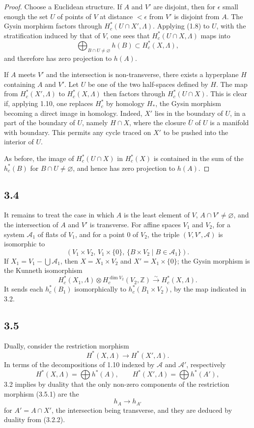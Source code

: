 \documentclass[11pt]{article}
\theoremstyle{definition}
\newcommand{\ZZ}{\mathbb Z}
\begin{document}
\begin{proof}
Choose a Euclidean structure.  If $A$ and $V'$ are disjoint, then for $\epsilon$ small enough the set $U$ of points of $V$ at distance $<\epsilon$ from $V'$ is disjoint from $A$.  The Gysin morphism factors through $H_c^*(U\cap X',\Lambda)$.  Applying (1.8) to $U$, with the stratification induced by that of $V$, one sees that $H_c^*(U\cap X,\Lambda)$ maps into
\[
\bigoplus_{B\cap U\neq\varnothing} h(B)\subset H_c^*(X,\Lambda),
\]
and therefore has zero projection to $h(A)$.

If $A$ meets $V'$ and the intersection is non-transverse, there exists a hyperplane $H$ containing $A$ and $V'$.  Let $U$ be one of the two half-spaces defined by $H$.  The map from $H_c^*(X',\Lambda)$ to $H_c^*(X,\Lambda)$ then factors through $H_c^*(U\cap X)$.  This is clear if, applying 1.10, one replaces $H_c^*$ by homology $H_*$, the Gysin morphism becoming a direct image in homology.  Indeed, $X'$ lies in the boundary of $U$, in a part of the boundary of $U$, namely $H\cap X$, where the closure $\overline U$ of $U$ is a manifold with boundary.  This permits any cycle traced on $X'$ to be pushed into the interior of $U$.

As before, the image of $H_c^*(U\cap X)$ in $H_c^*(X)$ is contained in the sum of the $h_c^*(B)$ for $B\cap U\neq\varnothing$, and hence has zero projection to $h(A)$.
\end{proof}

\subsection*{3.4}
It remains to treat the case in which $A$ is the least element of $V$, $A\cap V'\neq\varnothing$, and the intersection of $A$ and $V'$ is transverse.  For affine spaces $V_1$ and $V_2$, for a system $\mathcal A_1$ of flats of $V_1$, and for a point $0$ of $V_2$, the triple $(V,V',\mathcal A)$ is isomorphic to
\[
(V_1\times V_2,\, V_1\times\{0\},\, \{B\times V_2\mid B\in\mathcal A_1\}).
\]
If $X_1=V_1-\bigcup\mathcal A_1$, then $X=X_1\times V_2$ and $X'=X_1\times\{0\}$; the Gysin morphism is the Kunneth isomorphism
\[
H_c^*(X_1,\Lambda)\otimes H_c^{\dim V_2}(V_2,\ZZ)\xrightarrow{\sim}H_c^*(X,\Lambda).
\]
It sends each $h_c^*(B_1)$ isomorphically to $h_c^*(B_1\times V_2)$, by the map indicated in 3.2.

\subsection*{3.5}
Dually, consider the restriction morphism
\begin{equation}
H^*(X,\Lambda)\longrightarrow H^*(X',\Lambda).\tag{3.5.1}
\end{equation}
In terms of the decompositions of 1.10 indexed by $\mathcal A$ and $\mathcal A'$, respectively
\[
H^*(X,\Lambda)=\bigoplus h^*(A),\qquad H^*(X',\Lambda)=\bigoplus h^*(A'),
\]
3.2 implies by duality that the only non-zero components of the restriction morphism (3.5.1) are the
\[
h_A\longrightarrow h_{A'}
\]
for $A'=A\cap X'$, the intersection being transverse, and they are deduced by duality from (3.2.2).
\end{document}
